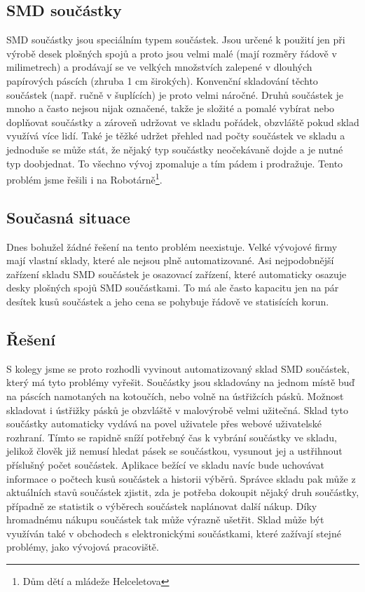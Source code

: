 \documentclass[12pt, a4paper, oneside]{article}
\begin{document}
\subsection{SMD součástky}

SMD součástky jsou speciálním typem součástek. Jsou určené k použití jen při výrobě desek plošných spojů a proto jsou velmi malé (mají rozměry řádově v milimetrech) a prodávají se ve velkých množstvích zalepené v dlouhých papírových páscích (zhruba 1 cm širokých). Konvenční skladování těchto součástek (např. ručně v šuplících) je proto velmi náročné. Druhů součástek je mnoho a často nejsou nijak označené, takže je složité a pomalé vybírat nebo doplňovat součástky a zároveň udržovat ve skladu pořádek, obzvláště pokud sklad využívá více lidí. Také je těžké udržet přehled nad počty součástek ve skladu a jednoduše se může stát, že nějaký typ součástky neočekávaně dojde a je nutné typ doobjednat. To všechno vývoj zpomaluje a tím pádem i prodražuje. Tento problém jsme řešili i na Robotárně\footnote{Dům dětí a mládeže Helceletova}.

\subsection{Současná situace}

Dnes bohužel žádné řešení na tento problém neexistuje. Velké vývojové firmy mají vlastní sklady, které ale nejsou plně automatizované. Asi nejpodobnější zařízení skladu SMD součástek je osazovací zařízení, které automaticky osazuje desky plošných spojů SMD součástkami. To má ale často kapacitu jen na pár desítek kusů součástek a jeho cena se pohybuje řádově ve statisících korun.

\subsection{Řešení}

S kolegy jsme se proto rozhodli vyvinout automatizovaný sklad SMD součástek, který má tyto problémy vyřešit.
Součástky jsou skladovány na jednom místě buď na páscích namotaných na kotoučích, nebo volně na ústřižcích pásků. Možnost skladovat i ústřižky pásků je obzvláště v malovýrobě velmi užitečná. Sklad tyto součástky automaticky vydává na povel uživatele přes webové uživatelské rozhraní. Tímto se rapidně sníží potřebný čas k vybrání součástky ve skladu, jelikož člověk již nemusí hledat pásek se součástkou, vysunout jej a ustřihnout příslušný počet součástek.
Aplikace bežící ve skladu navíc bude uchovávat informace o počtech kusů součástek a historii výběrů. Správce skladu pak může z aktuálních stavů součástek zjistit, zda je potřeba dokoupit nějaký druh součástky, případně ze statistik o výběrech součástek naplánovat další nákup. Díky hromadnému nákupu součástek tak může výrazně ušetřit.
Sklad může být využíván také v obchodech s elektronickými součástkami, které zažívají stejné problémy, jako vývojová pracoviště.
\end{document}
